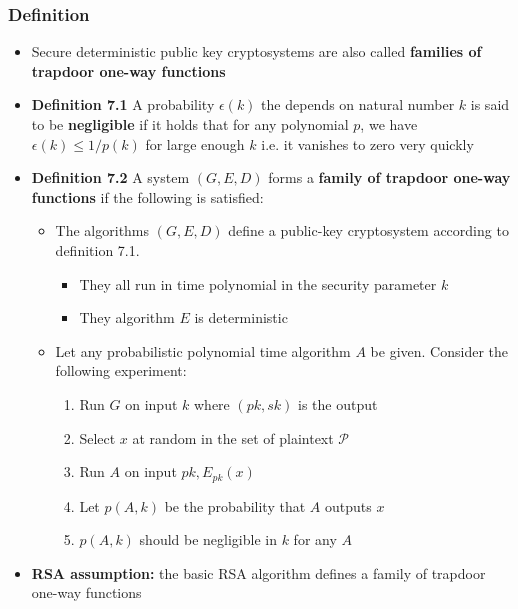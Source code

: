\subsubsection{Definition}
\begin{itemize}
  \item Secure deterministic public key cryptosystems are also called \textbf{families of trapdoor one-way functions}
  \item \textbf{Definition 7.1} A probability $\epsilon(k)$ the depends on natural number $k$ is said to be \textbf{negligible} if it holds that for any polynomial $p$, we have $\epsilon(k) \leq 1/p(k)$ for large enough $k$ i.e. it vanishes to zero very quickly

  \item \textbf{Definition 7.2} A system $(G,E,D)$ forms a \textbf{family of trapdoor one-way functions} if the following is satisfied:
  \begin{itemize}
  	\item The algorithms $(G,E,D)$ define a public-key cryptosystem according to definition 7.1.
    \begin{itemize}
  		\item They all run in time polynomial in the security parameter $k$
  		\item They algorithm $E$ is deterministic
    \end{itemize}
  	\item Let any probabilistic polynomial time algorithm $A$ be given. Consider the following experiment:
    \begin{enumerate}
  		\item Run $G$ on input $k$ where $(pk,sk)$ is the output
  		\item Select $x$ at random in the set of plaintext $\mathcal P$
  		\item Run $A$ on input $pk, E_{pk}(x)$
  		\item Let $p(A,k)$ be the probability that $A$ outputs $x$
  		\item $p(A,k)$ should be negligible in $k$ for any $A$
    \end{enumerate}
  \end{itemize}

  \item \textbf{RSA assumption:} the basic RSA algorithm defines a family of trapdoor one-way functions


\end{itemize}
